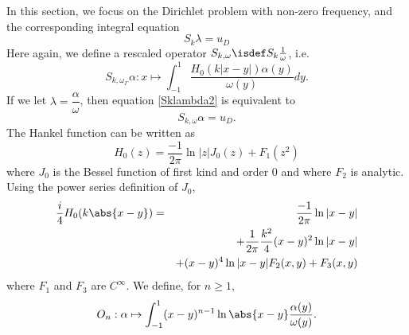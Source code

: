 \documentclass[a4paper]{article}
\begin{document}
	In this section, we focus on the Dirichlet problem with non-zero frequency, and the corresponding integral equation 
	\begin{equation}
	S_k \lambda = u_D
	\label{Sklambda2}
	\end{equation}
	Here again, we define a rescaled operator $S_{k,\omega} \isdef S_k \frac{1}{\omega}$, i.e.
	\[S_{k,\omega_{\Gamma}}\alpha : x \mapsto \int_{-1}^1 \dfrac{H_0(k|x-y|) \alpha(y)}{\omega(y)}dy.\]
	If we let $\lambda = \dfrac{\alpha}{\omega}$, then equation \eqref{Sklambda2} is equivalent to
	\[S_{k,\omega}\alpha = u_D.\]
	The Hankel function can be written as 
	\[H_0(z) = \frac{-1}{2\pi}\ln|z| J_0(z) + F_1(z^2)\]
	where $J_0$ is the Bessel function of first kind and order $0$ and where $F_2$ is analytic. Using the power series definition of $J_0$, 
	\begin{eqnarray*}
		\frac{i}{4}H_0(k \abs{x - y}) &=& \frac{-1}{2\pi}\ln |x-y|\\ 
		&&+ \frac{1}{2\pi} \frac{k^2}{4} (x- y)^2 \ln |x-y|\\
		&& + (x-y)^4 \ln|x-y|F_2(x,y) + F_3(x,y)
	\end{eqnarray*}
	where $F_1$ and $F_3$ are $C^{\infty}$. We define, for $n \geq 1$, 
	\[O_n : \alpha \mapsto \int_{-1}^{1}(x-y)^{n-1} \ln\abs{x - y} \frac{\alpha(y)}{\omega(y)}.\]
	
\end{document}
